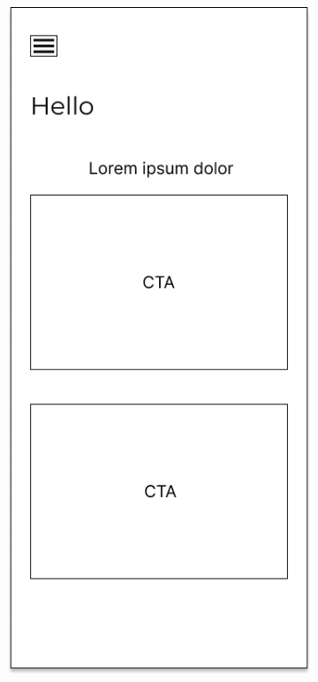 \begin{figure}[H]
	\centering
	\begin{subfigure}[b]{0.3\textwidth}
		\centering
	  \includegraphics[width=\linewidth]{contents/chapter-3/images/MF-home.png}

\end{subfigure}
\end{figure}
